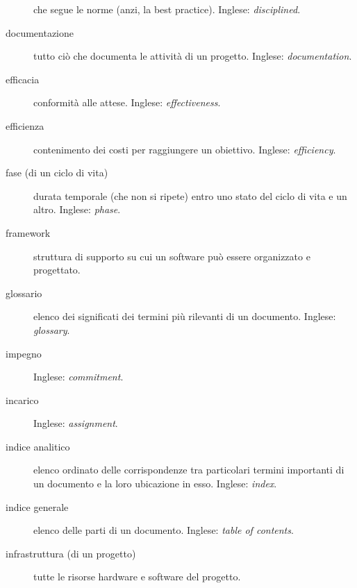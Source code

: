 \documentclass[a4paper]{article}
\begin{document}
\begin{description}
			che segue le norme (anzi, la best practice). Inglese: \emph{disciplined}.
			
	\item[documentazione] 

			tutto ciò che documenta le attività di un progetto. Inglese: \emph{documentation}.
			
	\item[efficacia] 

			conformità alle attese. Inglese: \emph{effectiveness}.
			
	\item[efficienza] 

			contenimento dei costi per raggiungere un obiettivo. Inglese: \emph{efficiency}.
			
	\item[fase (di un ciclo di vita)] 

			durata temporale (che non si ripete) entro uno stato del ciclo di vita e un altro. Inglese: \emph{phase}.
			
	\item[framework] 

			struttura di supporto su cui un software può essere organizzato e progettato.
			
	\item[glossario] 

			elenco dei significati dei termini più rilevanti di un documento. Inglese: \emph{glossary}.
			
	\item[impegno] 

			 Inglese: \emph{commitment}.
			
	\item[incarico] 

			 Inglese: \emph{assignment}.
			
	\item[indice analitico] 

			elenco ordinato delle corrispondenze tra particolari termini importanti di un documento e la loro ubicazione in esso. Inglese: \emph{index}.
			
	\item[indice generale] 

			elenco delle parti di un documento. Inglese: \emph{table of contents}.
			
	\item[infrastruttura (di un progetto)] 

			tutte le risorse hardware e software del progetto.
			

\end{description}
\end{document}
